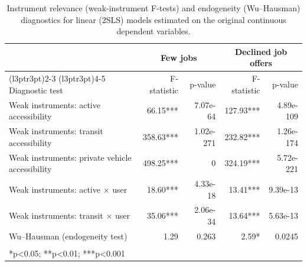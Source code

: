 \documentclass[preprint, 3p,
authoryear]{elsarticle} %
\begin{document}
\begin{table}[H]
\centering
\caption{\label{tab:unnamed-chunk-6}\label{tab:iv-diagnostics}Instrument relevance (weak-instrument F-tests) and endogeneity (Wu--Hausman) diagnostics for linear (2SLS) models estimated on the original continuous dependent variables.}
\centering
\begin{tabular}[t]{lrrrr}
\toprule
\multicolumn{1}{c}{ } & \multicolumn{2}{c}{Few jobs} & \multicolumn{2}{c}{Declined job offers} \\
\cmidrule(l{3pt}r{3pt}){2-3} \cmidrule(l{3pt}r{3pt}){4-5}
Diagnostic test & F-statistic & p-value & F-statistic & p-value\\
\midrule
Weak instruments: active accessibility & 66.15*** & 7.07e-64 & 127.93*** & 4.89e-109\\
Weak instruments: transit accessibility & 358.63*** & 1.02e-271 & 232.82*** & 1.26e-174\\
Weak instruments: private vehicle accessibility & 498.25*** & 0 & 324.19*** & 5.72e-221\\
Weak instruments: active × user & 18.60*** & 4.33e-18 & 13.41*** & 9.39e-13\\
Weak instruments: transit × user & 35.06*** & 2.06e-34 & 13.64*** & 5.63e-13\\
\addlinespace
Wu–Hausman (endogeneity test) & 1.29 & 0.263 & 2.59* & 0.0245\\
\bottomrule
\multicolumn{5}{l}{\textsuperscript{} *p<0.05; **p<0.01; ***p<0.001}\\
\end{tabular}
\end{table}

\renewcommand{\thetable}{A.3}
\end{document}
